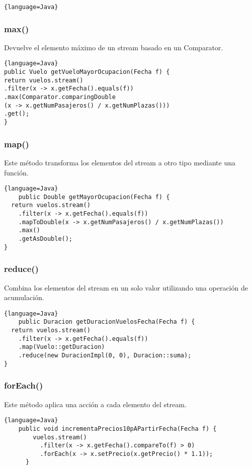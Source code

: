 \begin{center}
\begin{lstlisting}{language=Java}
    \end{lstlisting}

    \subsubsection{max()}
    Devuelve el elemento máximo de un stream basado en un Comparator.
    \begin{lstlisting}{language=Java}
public Vuelo getVueloMayorOcupacion(Fecha f) {
return vuelos.stream()
.filter(x -> x.getFecha().equals(f))
.max(Comparator.comparingDouble
(x -> x.getNumPasajeros() / x.getNumPlazas()))
.get();
}
\end{lstlisting}

\subsubsection{map()}
Este método transforma los elementos del stream a otro tipo mediante una función.
\begin{lstlisting}{language=Java}
    public Double getMayorOcupacion(Fecha f) {
  return vuelos.stream()
    .filter(x -> x.getFecha().equals(f))
    .mapToDouble(x -> x.getNumPasajeros() / x.getNumPlazas())
    .max()
    .getAsDouble();
}
\end{lstlisting}

\subsubsection{reduce()}
Combina los elementos del stream en un solo valor utilizando una operación de acumulación.
\begin{lstlisting}{language=Java}
    public Duracion getDuracionVuelosFecha(Fecha f) {
  return vuelos.stream()
    .filter(x -> x.getFecha().equals(f))
    .map(Vuelo::getDuracion)
    .reduce(new DuracionImpl(0, 0), Duracion::suma);
}
\end{lstlisting}

\subsubsection{forEach()}
Este método aplica una acción a cada elemento del stream.
\begin{lstlisting}{language=Java}
    public void incrementaPrecios10pAPartirFecha(Fecha f) {
        vuelos.stream()
          .filter(x -> x.getFecha().compareTo(f) > 0)
          .forEach(x -> x.setPrecio(x.getPrecio() * 1.1));
      }
      
\end{lstlisting}


\end{center}
